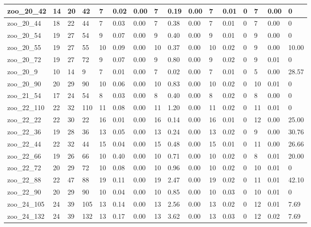 \begin{landscape}
\begin{longtable}{llllllllllllllll}
zoo\_20\_42 & 14 & 20 & 42 & 7 & 0.02 & 0.00 & 7 & 0.19 & 0.00 & 7 & 0.01 & 0 & 7 & 0.00 & 0 \\ \hline 
zoo\_20\_44 & 18 & 22 & 44 & 7 & 0.03 & 0.00 & 7 & 0.38 & 0.00 & 7 & 0.01 & 0 & 7 & 0.00 & 0 \\ \hline 
zoo\_20\_54 & 19 & 27 & 54 & 9 & 0.07 & 0.00 & 9 & 0.40 & 0.00 & 9 & 0.01 & 0 & 9 & 0.00 & 0 \\ \hline 
zoo\_20\_55 & 19 & 27 & 55 & 10 & 0.09 & 0.00 & 10 & 0.37 & 0.00 & 10 & 0.02 & 0 & 9 & 0.00 & 10.00 \\ \hline 
zoo\_20\_72 & 19 & 27 & 72 & 9 & 0.07 & 0.00 & 9 & 0.80 & 0.00 & 9 & 0.02 & 0 & 9 & 0.01 & 0 \\ \hline 
zoo\_20\_9 & 10 & 14 & 9 & 7 & 0.01 & 0.00 & 7 & 0.02 & 0.00 & 7 & 0.01 & 0 & 5 & 0.00 & 28.57 \\ \hline 
zoo\_20\_90 & 20 & 29 & 90 & 10 & 0.06 & 0.00 & 10 & 0.83 & 0.00 & 10 & 0.02 & 0 & 10 & 0.01 & 0 \\ \hline 
zoo\_21\_54 & 17 & 24 & 54 & 8 & 0.03 & 0.00 & 8 & 0.40 & 0.00 & 8 & 0.02 & 0 & 8 & 0.00 & 0 \\ \hline 
zoo\_22\_110 & 22 & 32 & 110 & 11 & 0.08 & 0.00 & 11 & 1.20 & 0.00 & 11 & 0.02 & 0 & 11 & 0.01 & 0 \\ \hline 
zoo\_22\_22 & 22 & 30 & 22 & 16 & 0.01 & 0.00 & 16 & 0.14 & 0.00 & 16 & 0.01 & 0 & 12 & 0.00 & 25.00 \\ \hline 
zoo\_22\_36 & 19 & 28 & 36 & 13 & 0.05 & 0.00 & 13 & 0.24 & 0.00 & 13 & 0.02 & 0 & 9 & 0.00 & 30.76 \\ \hline 
zoo\_22\_44 & 22 & 32 & 44 & 15 & 0.04 & 0.00 & 15 & 0.48 & 0.00 & 15 & 0.01 & 0 & 11 & 0.00 & 26.66 \\ \hline 
zoo\_22\_66 & 19 & 26 & 66 & 10 & 0.40 & 0.00 & 10 & 0.71 & 0.00 & 10 & 0.02 & 0 & 8 & 0.01 & 20.00 \\ \hline 
zoo\_22\_72 & 20 & 29 & 72 & 10 & 0.08 & 0.00 & 10 & 0.96 & 0.00 & 10 & 0.02 & 0 & 10 & 0.01 & 0 \\ \hline 
zoo\_22\_88 & 22 & 47 & 88 & 19 & 0.11 & 0.00 & 19 & 2.47 & 0.00 & 19 & 0.02 & 0 & 11 & 0.01 & 42.10 \\ \hline 
zoo\_22\_90 & 20 & 29 & 90 & 10 & 0.04 & 0.00 & 10 & 0.85 & 0.00 & 10 & 0.03 & 0 & 10 & 0.01 & 0 \\ \hline 
zoo\_24\_105 & 24 & 39 & 105 & 13 & 0.14 & 0.00 & 13 & 2.56 & 0.00 & 13 & 0.02 & 0 & 12 & 0.01 & 7.69 \\ \hline 
zoo\_24\_132 & 24 & 39 & 132 & 13 & 0.17 & 0.00 & 13 & 3.62 & 0.00 & 13 & 0.03 & 0 & 12 & 0.02 & 7.69 \\ \hline 

\end{longtable}
\end{landscape}
